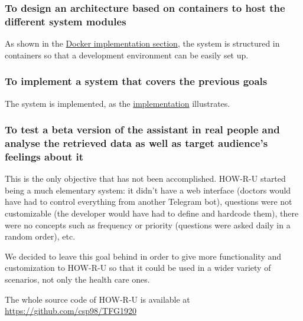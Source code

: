 \documentclass[12pt,english]{article}
\begin{document}
\subsubsection{To design an architecture based on containers to host the different system modules}

As shown in the \hyperref[sec:docker]{Docker implementation section}, the system is structured in containers so that a development environment can be easily set up.

\subsubsection{To implement a system that covers the previous goals}

The system is implemented, as the \hyperref[sec:implementation]{implementation} illustrates.

\subsubsection{To test a beta version of the assistant in real people and analyse the retrieved data as well as target audience’s feelings about it}

This is the only objective that has not been accomplished. HOW-R-U started being a much elementary system: it didn't have a web interface (doctors would have had to control everything from another Telegram bot), questions were not customizable (the developer would have had to define and hardcode them), there were no concepts such as frequency or priority (questions were asked daily in a random order), etc.

We decided to leave this goal behind in order to give more functionality and customization to HOW-R-U so that it could be used in a wider variety of scenarios, not only the health care ones.

The whole source code of HOW-R-U is available at \href{https://github.com/csp98/TFG1920}{https://github.com/csp98/TFG1920}

\newpage


\doclicenseThis
\end{document}
